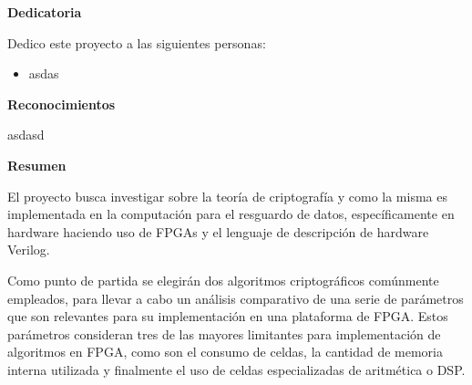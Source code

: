 \begin{center}\huge{\textbf{Dedicatoria}}\end{center}

Dedico este proyecto a las siguientes personas:
\begin{itemize} 
\item asdas
\end{itemize}

\cleardoublepage

\begin{center}\huge{\textbf{Reconocimientos}}\end{center}
asdasd
\cleardoublepage

\begin{center}\huge{\textbf{Resumen}}\end{center}


El proyecto busca investigar sobre la teoría de criptografía y como la misma es implementada en la computación para el resguardo de datos, específicamente en hardware haciendo uso de FPGAs y el lenguaje de descripción de hardware Verilog. 

Como punto de partida se elegirán dos algoritmos criptográficos comúnmente empleados, para llevar a cabo un análisis comparativo de una serie de parámetros que son relevantes para su implementación en una plataforma de FPGA. Estos parámetros consideran tres de las mayores limitantes para implementación de algoritmos en FPGA, como son el consumo de celdas, la cantidad de memoria interna utilizada y finalmente el uso de celdas especializadas de aritmética o DSP.
